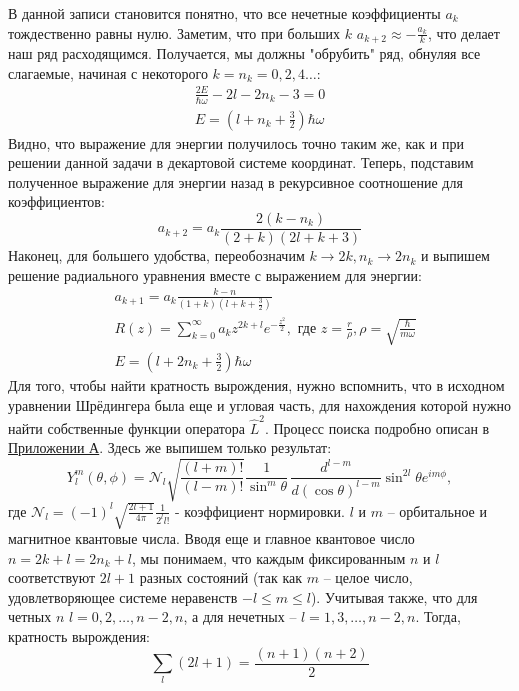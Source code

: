 В данной записи становится понятно, что все нечетные коэффициенты $a_k$ тождественно равны нулю. Заметим, что при больших $k$ $a_{k+2} \approx -\frac{a_k}{k}$, что делает наш ряд расходящимся. Получается, мы должны "обрубить" ряд, обнуляя все слагаемые, начиная с некоторого $k = n_k = 0, 2, 4 \dots$:
\begin{gather*}
    \frac{2E}{\hbar\omega}-2l-2n_k-3 = 0\\
    E = \left(l+n_k+\frac{3}{2}\right)\hbar\omega
\end{gather*}
Видно, что выражение для энергии получилось точно таким же, как и при решении данной задачи в декартовой системе координат. Теперь, подставим полученное выражение для энергии назад в рекурсивное соотношение для коэффициентов:
\[
a_{k+2} = a_k\frac{2(k-n_k)}{(2+k)(2l+k+3)}
\]
Наконец, для большего удобства, переобозначим $k\rightarrow2k, n_k\rightarrow2n_k$ и выпишем решение радиального уравнения вместе с выражением для энергии:
\begin{align*}
    &a_{k+1} = a_k\frac{k-n}{\left(1+k\right)\left(l+k+\frac{3}{2}\right)} \\
    &R(z) = \sum_{k=0}^\infty a_k z^{2k+l} e^{-\frac{z^2}{2}}, \text{ где } z = \frac{r}{\rho}, \rho = \sqrt{\frac{\hbar}{m\omega}} \\
    &E = \left(l+2n_k+\frac{3}{2}\right)\hbar\omega
\end{align*}
Для того, чтобы найти кратность вырождения, нужно вспомнить, что в исходном уравнении Шрёдингера была еще и угловая часть, для нахождения которой нужно найти собственные функции оператора $\hat{L}^2$. Процесс поиска подробно описан в \hyperref[appendix:A]{Приложении А}. Здесь же выпишем только результат:
\[
Y^m_l(\theta, \phi) = \mathcal{N}_l\sqrt{\frac{(l+m)!}{(l-m)!}} \frac{1}{\sin^{m}\theta}\,\frac{d^{l-m}}{d(\cos\theta)^{l-m}}\sin^{2l}\theta e^{im\phi},
\]
где $\mathcal{N}_l = (-1)^l \sqrt{\frac{2l+1}{4\pi}}\frac{1}{2^l l!}$ - коэффициент нормировки. $l$ и $m$ -- орбитальное и магнитное квантовые числа. Вводя еще и главное квантовое число $n=2k+l=2n_k+l$, мы понимаем, что каждым фиксированным $n$ и $l$ соответствуют $2l+1$ разных состояний (так как $m$ -- целое число, удовлетворяющее системе неравенств $-l\leq m\leq l$). Учитывая также, что для четных $n$ $l = 0, 2, \dots, n-2, n$, а для нечетных -- $l = 1, 3, \dots, n-2, n$. Тогда, кратность вырождения:
\[
\sum_l (2l+1) = \frac{(n+1)(n+2)}{2}
\]





